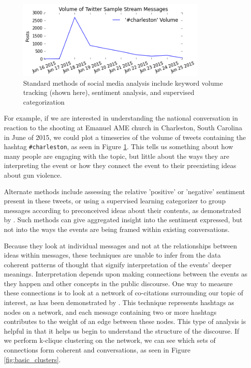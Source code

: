 \documentclass[12pt]{article}
\begin{document}
\begin{figure}[!ht]
  \centering
    \includegraphics[width=0.85\textwidth]{F1_keyword_volume.png}
    \caption{Standard methods of social media analysis  include keyword volume tracking (shown here),  sentiment analysis, and supervised categorization}
  \label{fig:keyword_vol}
\end{figure}

For example, if we are interested in understanding the national conversation in reaction to the shooting at Emanuel AME church in Charleston, South Carolina in June of 2015, we could plot a timeseries of the volume of tweets containing the hashtag \texttt{\#charleston}, as seen in Figure \ref{fig:keyword_vol}. This tells us something about how many people are engaging with the topic, but little about the ways they are interpreting the event or how they connect the event to their preexisting ideas about gun violence.

Alternate methods include assessing the relative 'positive' or 'negative' sentiment present in these tweets, or using a supervised learning categorizer to group messages according to preconceived ideas about their contents, as demonstrated by \cite{Becker2011,Ritter2010,Zubiaga2011}. Such methods can give aggregated insight into the sentiment expressed, but not into the ways the events are being framed within existing conversations.

Because they look at individual messages and not at the relationships between ideas within messages, these techniques are unable to infer from the data coherent patterns of thought that signify interpretation of the events' deeper meanings. 
Interpretation depends upon making connections between the events as they happen and other concepts in the public discourse. 
One way to measure these connections is to look at a network of co-citations surrounding our topic of interest, as has been demonstrated by \cite{Cogan2012,Smith2014}. 
This technique represents hashtags as nodes on a network, and each message containing two or more hashtags contributes to the weight of an edge between these nodes. 
This type of analysis is helpful in that it helps us begin to understand the structure of the discourse. 
If we perform k-clique clustering on the network, we can see which sets of connections form coherent and conversations, as seen in Figure \ref{fig:basic_clusters}.
\end{document}
